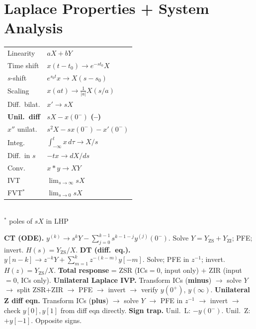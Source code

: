\documentclass[11pt]{extarticle}
\begin{document}
\FloatBarrier
\bigskip

\section*{Laplace Properties + System Analysis}

\begin{table}
  \begin{tabular}{@{}l l@{}}
    \toprule
    Linearity & $aX{+}bY$ \\
    Time shift & $x(t{-}t_0)\!\to\!e^{-st_0}X$ \\
    $s$-shift & $e^{s_0 t}x\!\to\!X(s{-}s_0)$ \\
    Scaling & $x(at)\!\to\!\tfrac{1}{|a|}X(s/a)$ \\
    Diff.\ bilat. & $x'\!\to\!sX$ \\
    \textbf{Unil.\ diff} & $sX{-}x(0^-)$ \textbf{(--)} \\
    $x''$ unilat. & $s^2X{-}sx(0^-){-}x'(0^-)$ \\
    Integ. & $\int_{-\infty}^t\!x\,d\tau\!\to\!X/s$ \\
    Diff.\ in $s$ & $-tx\!\to\!dX/ds$ \\
    Conv. & $x*y\!\to\!XY$ \\
    IVT & $\lim_{s\to\infty}\!sX$ \\
    FVT$^\ast$ & $\lim_{s\to 0}\!sX$ \\
    \bottomrule
  \end{tabular}\\[1pt]
  {\footnotesize$^\ast$ poles of $sX$ in LHP}
\end{table}
\textbf{CT (ODE).} $y^{(k)}\!\to\! s^k Y - \sum_{j=0}^{k-1}\! s^{k-1-j} y^{(j)}(0^-)$. Solve $Y=Y_{\text{ZS}}+Y_{\text{ZI}}$; PFE; invert. $H(s)=Y_{\text{ZS}}/X$.
\textbf{DT (diff.\ eq.).} $y[n{-}k]\to z^{-k}Y + \sum_{m=1}^k z^{-(k-m)}y[-m]$. Solve; PFE in $z^{-1}$; invert. $H(z)=Y_{\text{ZS}}/X$.
\textbf{Total response} = ZSR (ICs$=0$, input only) $+$ ZIR (input$=0$, ICs only).
\textbf{Unilateral Laplace IVP.} Transform ICs (\textbf{minus}) $\to$ solve $Y$ $\to$ split ZSR+ZIR $\to$ PFE $\to$ invert $\to$ verify $y(0^+)$, $y(\infty)$.
\textbf{Unilateral Z diff eqn.} Transform ICs (\textbf{plus}) $\to$ solve $Y$ $\to$ PFE in $z^{-1}$ $\to$ invert $\to$ check $y[0],y[1]$ from diff eqn directly.
\textbf{Sign trap.} Unil.\ L: $\mathbf{-}y(0^-)$. Unil.\ Z: $\mathbf{+}y[-1]$. Opposite signs.
\end{document}

